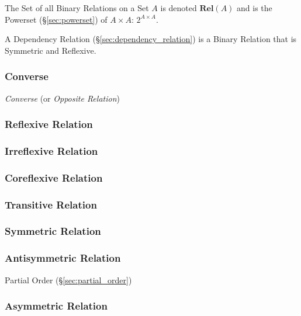 The Set of all Binary Relations on a Set $A$ is denoted
$\mathbf{Rel}(A)$ and is the Powerset (\S\ref{sec:powerset}) of $A
\times A$: $2^{A \times A}$.

A Dependency Relation (\S\ref{sec:dependency_relation}) is a Binary
Relation that is Symmetric and Reflexive.



\subsubsection{Converse}\label{sec:converse}

\emph{Converse} (or \emph{Opposite Relation})



\subsubsection{Reflexive Relation}\label{sec:reflexive_relation}

\subsubsection{Irreflexive Relation}\label{sec:irreflexive_relation}

\subsubsection{Coreflexive Relation}\label{sec:coreflexive_relation}

\subsubsection{Transitive Relation}\label{sec:transitive_relation}

\subsubsection{Symmetric Relation}\label{sec:symmetric_relation}

\subsubsection{Antisymmetric Relation}\label{sec:antisymmetric_relation}

Partial Order (\S\ref{sec:partial_order})



\subsubsection{Asymmetric Relation}\label{sec:asymmetric_relation}

